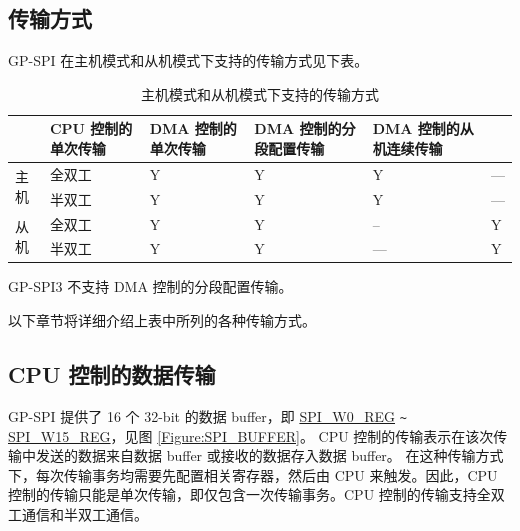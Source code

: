 \documentclass[main\_\_CN.tex]{subfiles}
\begin{document}
\subsection{传输方式}

GP-SPI 在主机模式和从机模式下支持的传输方式见下表。

\begin{table}[H]
    \centering
    \caption{主机模式和从机模式下支持的传输方式}
    \label{tab:transfer-modes}
    \begin{threeparttable}
    \begin{tabular}{|l|l|p{2.5cm}<{\centering}|p{2.5cm}<{\centering}|p{3.3cm}<{\centering}|p{3.3cm}<{\centering}| }
    \hline
        \rowcolor{lightgray}
        \multicolumn{2}{l|}{\textbf{模式}}  & \textbf{CPU 控制的单次传输}  & \textbf{DMA 控制的单次传输} &   \textbf{DMA 控制的分段配置传输\tnote{*}}    & \textbf{DMA 控制的从机连续传输} \\\hline
    \multirow{2}{*}{主机} & 全双工 & Y & Y & Y & ---\\\cline{2-6}

    & 半双工 & Y & Y & Y & ---\\\hline

    \multirow{2}{*}{从机} & 全双工 & Y & Y & -- &Y \\\cline{2-6}
    & 半双工 & Y & Y & --- &Y \\\hline
        \end{tabular}
            \begin{tablenotes}
            \item[*]GP-SPI3 不支持 DMA 控制的分段配置传输。
        \end{tablenotes}
     \end{threeparttable}
    \end{table}

以下章节将详细介绍上表中所列的各种传输方式。

\subsection{CPU 控制的数据传输}\label{sec:cpu-controlled-data-transfer}
GP-SPI 提供了 16 个 32-bit 的数据 buffer，即 \hyperref[regdesc:SPIW0REG]{SPI\_W0\_REG} \verb+~+ \hyperref[regdesc:SPIW15REG]{SPI\_W15\_REG}，见图  \ref{Figure:SPI_BUFFER}。
CPU 控制的传输表示在该次传输中发送的数据来自数据 buffer 或接收的数据存入数据 buffer。
在这种传输方式下，每次传输事务均需要先配置相关寄存器，然后由 CPU 来触发。因此，CPU 控制的传输只能是单次传输，即仅包含一次传输事务。CPU 控制的传输支持全双工通信和半双工通信。
\end{document}
